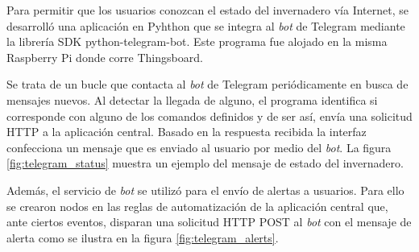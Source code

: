Para permitir que los usuarios conozcan el estado del invernadero vía Internet, se desarrolló una aplicación en Pyhthon que se integra al \textit{bot} de Telegram mediante la librería SDK python-telegram-bot. Este programa fue alojado en la misma Raspberry Pi donde corre Thingsboard.


Se trata de un bucle que contacta al \textit{bot} de Telegram periódicamente en busca de mensajes nuevos. Al detectar la llegada de alguno, el programa identifica si corresponde con alguno de los comandos definidos y de ser así, envía una solicitud HTTP a la aplicación central. Basado en la respuesta recibida la interfaz confecciona un mensaje que es enviado al usuario por medio del \textit{bot}. La figura \ref{fig:telegram_status} muestra un ejemplo del mensaje de estado del invernadero.

Además, el servicio de \textit{bot} se utilizó para el envío de alertas a  usuarios. Para ello se crearon nodos en las reglas de automatización de la aplicación central que, ante ciertos eventos, disparan una solicitud HTTP POST al \textit{bot} con el mensaje de alerta como se ilustra en la figura \ref{fig:telegram_alerts}.



